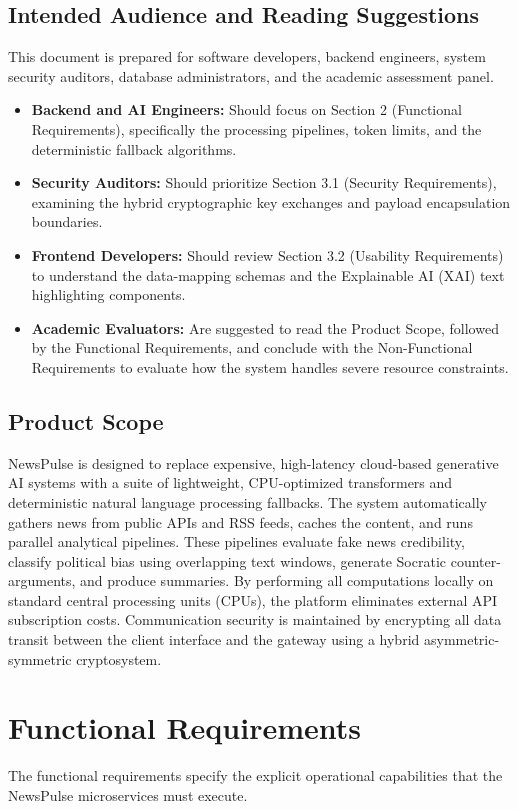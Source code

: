 \subsection{Intended Audience and Reading Suggestions}
This document is prepared for software developers, backend engineers, system security auditors, database administrators, and the academic assessment panel. 
\begin{itemize}
    \item \textbf{Backend and AI Engineers:} Should focus on Section 2 (Functional Requirements), specifically the processing pipelines, token limits, and the deterministic fallback algorithms.
    \item \textbf{Security Auditors:} Should prioritize Section 3.1 (Security Requirements), examining the hybrid cryptographic key exchanges and payload encapsulation boundaries.
    \item \textbf{Frontend Developers:} Should review Section 3.2 (Usability Requirements) to understand the data-mapping schemas and the Explainable AI (XAI) text highlighting components.
    \item \textbf{Academic Evaluators:} Are suggested to read the Product Scope, followed by the Functional Requirements, and conclude with the Non-Functional Requirements to evaluate how the system handles severe resource constraints.
\end{itemize}

\subsection{Product Scope}
NewsPulse is designed to replace expensive, high-latency cloud-based generative AI systems with a suite of lightweight, CPU-optimized transformers and deterministic natural language processing fallbacks. The system automatically gathers news from public APIs and RSS feeds, caches the content, and runs parallel analytical pipelines. These pipelines evaluate fake news credibility, classify political bias using overlapping text windows, generate Socratic counter-arguments, and produce summaries. By performing all computations locally on standard central processing units (CPUs), the platform eliminates external API subscription costs. Communication security is maintained by encrypting all data transit between the client interface and the gateway using a hybrid asymmetric-symmetric cryptosystem.

\section{Functional Requirements}
The functional requirements specify the explicit operational capabilities that the NewsPulse microservices must execute.


